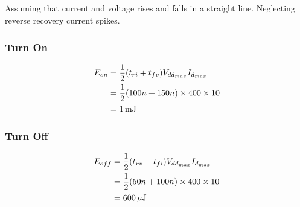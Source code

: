 \subsection{}

Assuming that current and voltage rises and falls in a straight line. Neglecting reverse recovery current spikes.

\subsubsection*{Turn On}


\begin{align*}
E_{on} & = \frac{1}{2} (t_{ri} + t_{fv}) V_{dd_{max} } I_{d_{max}} \\
        & = \frac{1}{2} (100n+150n) \times 400 \times 10 \\
        & = \unit[1]{mJ}
\end{align*}

\subsubsection*{Turn Off}


\begin{align*}
E_{off} & = \frac{1}{2} (t_{rv} + t_{fi}) V_{dd_{max} } I_{d_{max}} \\
        & = \frac{1}{2} (50n + 100n) \times 400 \times 10 \\
        & = \unit[600]{\mu{}J}
\end{align*}
